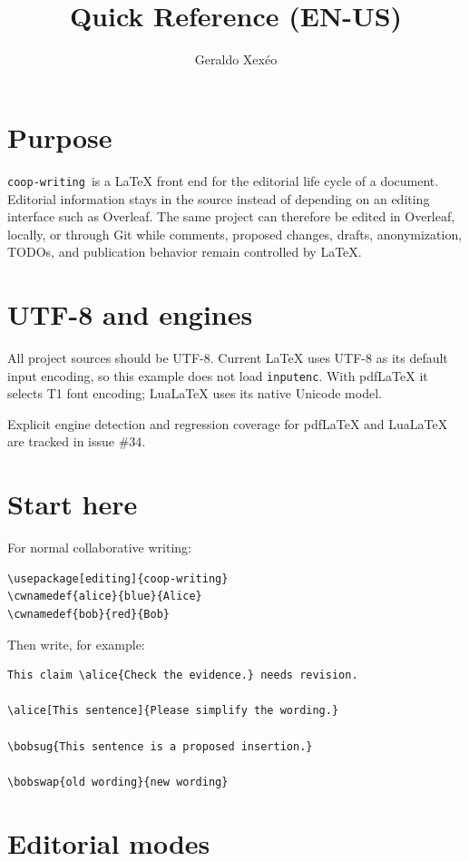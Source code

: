 \documentclass[11pt]{article}
\title{\pkg\ \coopwritingversion\\Quick Reference (EN-US)}
\author{Geraldo Xexéo}
\date{}
\newcommand{\pkg}{\texttt{coop-writing}}
\begin{document}
\maketitle

\section*{Purpose}

\pkg\ is a LaTeX front end for the editorial life cycle of a document. Editorial information stays in the source instead of depending on an editing interface such as Overleaf. The same project can therefore be edited in Overleaf, locally, or through Git while comments, proposed changes, drafts, anonymization, TODOs, and publication behavior remain controlled by LaTeX.

\section*{UTF-8 and engines}

All project sources should be UTF-8. Current LaTeX uses UTF-8 as its default input encoding, so this example does not load \texttt{inputenc}. With pdfLaTeX it selects T1 font encoding; LuaLaTeX uses its native Unicode model.

Explicit engine detection and regression coverage for pdfLaTeX and LuaLaTeX are tracked in issue \#34.

\section*{Start here}

For normal collaborative writing:

\begin{verbatim}
\usepackage[editing]{coop-writing}
\cwnamedef{alice}{blue}{Alice}
\cwnamedef{bob}{red}{Bob}
\end{verbatim}

Then write, for example:

\begin{verbatim}
This claim \alice{Check the evidence.} needs revision.

\alice[This sentence]{Please simplify the wording.}

\bobsug{This sentence is a proposed insertion.}

\bobswap{old wording}{new wording}
\end{verbatim}

\section*{Editorial modes}
\end{document}
